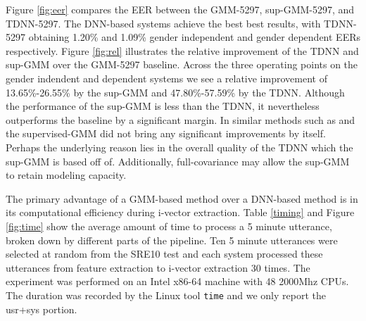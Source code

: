 \documentclass{article}
\begin{document}
Figure \ref{fig:eer} compares the EER between the GMM-5297,
sup-GMM-5297, and TDNN-5297. The DNN-based systems achieve the best
best results, with TDNN-5297 obtaining 1.20\% and 1.09\%
gender independent and gender dependent EERs respectively.
Figure \ref{fig:rel} illustrates the relative improvement of the
TDNN and sup-GMM over the GMM-5297 baseline. Across the three
operating points on the gender indendent and dependent systems we 
see a relative improvement of 13.65\%-26.55\%
by the sup-GMM and 47.80\%-57.59\% by the TDNN. Although
the performance of the sup-GMM is less than the TDNN,
it nevertheless outperforms the baseline by a significant
margin. In similar methods such as \cite{lei2014} and \cite{omar2010}
the supervised-GMM did not bring any significant improvements by
itself. Perhaps the underlying reason lies in the overall quality of
the TDNN which the sup-GMM is based off of. Additionally, 
full-covariance may allow the sup-GMM to retain modeling capacity.






The primary advantage of a GMM-based method over a DNN-based method is
in its computational efficiency during i-vector extraction. Table \ref{timing} and 
Figure \ref{fig:time} show the average amount of
time to process a 5 minute utterance, broken down by different
parts of the pipeline. Ten 5 minute utterances were selected at random from the SRE10 test and each system
processed these utterances from feature extraction to i-vector extraction
30 times. The experiment was performed on an
 Intel x86-64 machine with 48 2000Mhz
CPUs. The duration was recorded by the Linux
tool \texttt{time} and we only report the usr+sys portion. 
\end{document}
